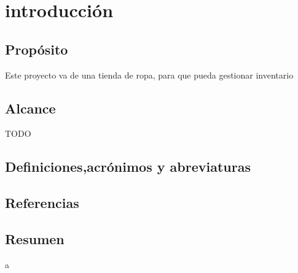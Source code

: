 \section{introducción}
\subsection{Propósito}
Este proyecto va de una tienda de ropa, para que pueda gestionar inventario
\subsection{Alcance}
TODO
\subsection{Definiciones,acrónimos y abreviaturas}
\subsection{Referencias}
\subsection{Resumen}



a
